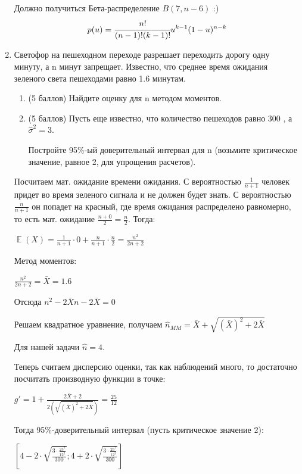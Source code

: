 \documentclass[12pt]{article}
\DeclareMathOperator{\E}{\mathbb{E}}
\newenvironment{solution}{}{}
\begin{document}
\begin{enumerate}
\begin{solution}
Должно получиться Бета-распределение $B(7, n-6)$ :)
$$p(u)=\cfrac{n!}{(n-1)!(k-1)!}u^{k-1}(1-u)^{n-k}$$
\end{solution}
    
    \item Светофор на пешеходном переходе разрешает переходить дорогу одну минуту, а n минут запрещает. Известно, что среднее время ожидания зеленого света пешеходами равно 1.6 минутам.
    
    \begin{enumerate}
        \item (5 баллов) Найдите оценку для n методом моментов.
        \item (5 баллов) Пусть еще известно, что количество пешеходов равно 300 , а $\hat{\sigma}^2 = 3$.
        
        Постройте 95\%-ый доверительный интервал для n (возьмите критическое значение, равное 2, для упрощения расчетов). 
    \end{enumerate}
    
\begin{solution}

    Посчитаем мат. ожидание времени ожидания. С вероятностью $\frac{1}{n + 1}$ человек придет во время зеленого сигнала и не должен будет знать. С вероятностью $\frac{n}{n + 1}$ он попадет на красный, где время ожидания распределено равномерно, то есть мат. ожидание $\frac{n + 0}{2} = \frac{n}{2}$. Тогда:
    
    $\E(X) = \frac{1}{n + 1} \cdot 0 + \frac{n}{n + 1} \cdot \frac{n}{2}= \frac{n^2}{2n + 2}$
    
    Метод моментов:
    
    $\frac{n^2}{2n + 2} = \bar{X} = 1.6$
    
    Отсюда $n^2 - 2\bar{X}n -2\bar{X} = 0$
    
    Решаем квадратное уравнение, получаем $\hat{n}_{MM} = \bar{X} + \sqrt{(\bar{X})^2 + 2\bar{X}}$
    
    Для нашей задачи $\hat{n} = 4$.
    
    Теперь считаем дисперсию оценки, так как наблюдений много, то достаточно посчитать производную функции в точке:
    
    $g' = 1 + \frac{2\bar{X} + 2}{2 (\sqrt{(\bar{X})^2 + 2\bar{X}})} = \frac{25}{12}$
    
    Тогда 95\%-доверительный интервал (пусть критическое значение 2):
    
    $[4 - 2 \cdot \sqrt{\frac{3 \cdot \frac{25^2}{12^2}}{300}}; 4 + 2 \cdot \sqrt{\frac{3 \cdot \frac{25^2}{12^2}}{300}}]$
    

\end{solution}
\end{enumerate}
\end{document}
